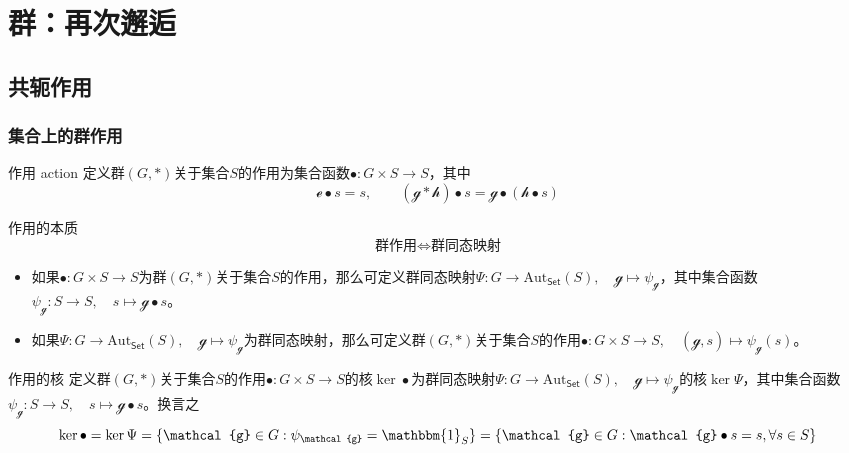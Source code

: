 % 

% 

\chapter{群：再次邂逅}

\section{共轭作用}

\subsection{集合上的群作用}

\begin{definition}{作用 action}
	定义群$(G,*)$关于集合$S$的作用为集合函数$\bullet:G\times S\to S$，其中
	$$
	\mathcal{e}\bullet s=s,\qquad
	(\mathcal{g}*\mathcal{h})\bullet s=\mathcal{g}\bullet(\mathcal{h}\bullet s)
	$$
\end{definition}

\begin{theorem}{作用的本质}
	$$
	\text{群作用}\iff\text{群同态映射}
	$$
	\begin{itemize}
		\item 如果$\bullet:G\times S\to S$为群$(G,*)$关于集合$S$的作用，那么可定义群同态映射$\Psi:G\to \mathrm{Aut}_{\mathsf{Set}}(S),\quad \mathcal{g}\mapsto \psi_{\mathcal{g}}$，其中集合函数$\psi_{\mathcal{g}}:S\to S,\quad s\mapsto \mathcal{g}\bullet s$。
		\item 如果$\Psi:G\to \mathrm{Aut}_{\mathsf{Set}}(S),\quad \mathcal{g}\mapsto \psi_{\mathcal{g}}$为群同态映射，那么可定义群$(G,*)$关于集合$S$的作用$\bullet:G\times S\to S,\quad (\mathcal{g},s)\mapsto \psi_{\mathcal{g}}(s)$。
	\end{itemize}
\end{theorem}

\begin{definition}{作用的核}
	定义群$(G,*)$关于集合$S$的作用$\bullet:G\times S\to S$的核$\ker\bullet$为群同态映射$\Psi:G\to \mathrm{Aut}_{\mathsf{Set}}(S),\quad \mathcal{g}\mapsto \psi_{\mathcal{g}}$的核$\ker\Psi$，其中集合函数$\psi_{\mathcal{g}}:S\to S,\quad s\mapsto \mathcal{g}\bullet s$。换言之
	$$
	\ker\bullet=\ker\Psi=\{ \mathcal{g}\in G:\psi_{\mathcal{g}}=\mathbbm{1}_S \}=\{ \mathcal{g}\in G:\mathcal{g}\bullet s= s,\forall s\in S \}
	$$
\end{definition}

